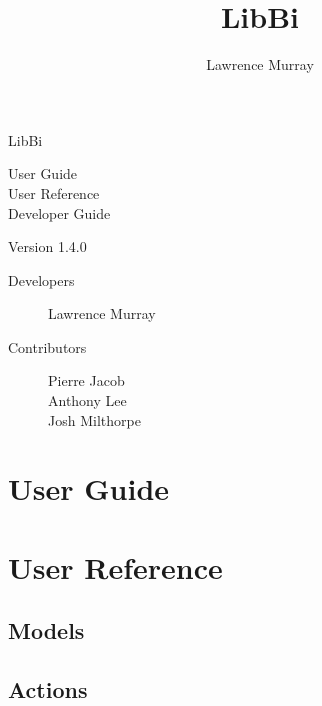 \documentclass[a4paper,notitlepage]{refrep}
\title{LibBi}
\author{Lawrence Murray}
\date{}
\makeatletter
\newcommand*{\toccontents}{\@starttoc{toc}}
\makeatother
\begin{document}
\pagestyle{empty}

\begin{leftbar}

\vspace{3cm}

\fontsize{72pt}{92pt}\selectfont
LibBi

\vspace{6cm}

\fontsize{24pt}{30pt}\selectfont
User Guide \\
User Reference \\
Developer Guide

\vspace{6cm}

\fontsize{16pt}{24pt}\selectfont
Version 1.4.0

\vspace{1cm}

\end{leftbar}

\newpage
\setcounter{page}{1}
\pagestyle{plain}

{\footnotesize
\begin{description}
\item[Developers]
  Lawrence Murray
\item[Contributors]
  Pierre Jacob \\
  Anthony Lee \\
  Josh Milthorpe
\end{description}
}

\newpage
\toccontents

\newpage
\setcounter{page}{1}

\chapter{User Guide\label{User_Guide}}



\chapter{User Reference\label{User_Reference}}

\section{Models}


\section{Actions}

\end{document}
